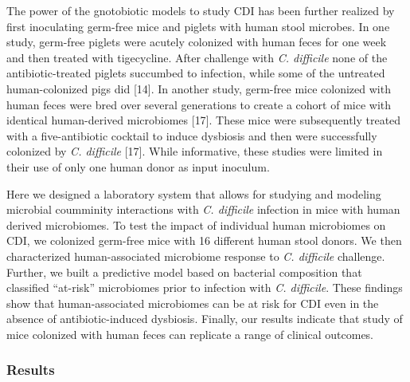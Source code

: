 \documentclass[11pt,]{article}
\begin{document}
The power of the gnotobiotic models to study CDI has been further
realized by first inoculating germ-free mice and piglets with human
stool microbes. In one study, germ-free piglets were acutely colonized
with human feces for one week and then treated with tigecycline. After
challenge with \emph{C. difficile} none of the antibiotic-treated
piglets succumbed to infection, while some of the untreated
human-colonized pigs did {[}14{]}. In another study, germ-free mice
colonized with human feces were bred over several generations to create
a cohort of mice with identical human-derived microbiomes {[}17{]}.
These mice were subsequently treated with a five-antibiotic cocktail to
induce dysbiosis and then were successfully colonized by \emph{C.
difficile} {[}17{]}. While informative, these studies were limited in
their use of only one human donor as input inoculum.

Here we designed a laboratory system that allows for studying and
modeling microbial coumminity interactions with \emph{C. difficile}
infection in mice with human derived microbiomes. To test the impact of
individual human microbiomes on CDI, we colonized germ-free mice with 16
different human stool donors. We then characterized human-associated
microbiome response to \emph{C. difficile} challenge. Further, we built
a predictive model based on bacterial composition that classified
``at-risk'' microbiomes prior to infection with \emph{C. difficile}.
These findings show that human-associated microbiomes can be at risk for
CDI even in the absence of antibiotic-induced dysbiosis. Finally, our
results indicate that study of mice colonized with human feces can
replicate a range of clinical outcomes.

\subsubsection{Results}\label{results}
\end{document}

